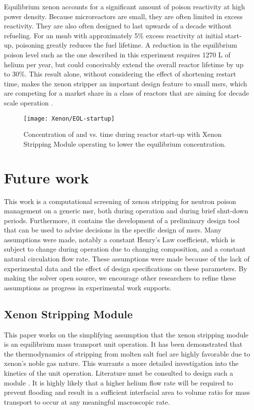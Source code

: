  Equilibrium xenon accounts for a significant amount of poison reactivity at high power density. Because microreactors are small, they are often limited in excess reactivity. They are also often designed to last upwards of a decade without refueling. For an \acs{msnb} with approximately 5\% excess reactivity at initial start-up, \Xe poisoning greatly reduces the fuel lifetime. A reduction in the equilibrium poison level such as the one described in this experiment requires 1270 L of helium per year, but could conceivably extend the overall reactor lifetime by up to 30\%.
This result alone, without considering the effect of shortening restart time, makes the xenon stripper an important design feature to small \acsp{msr}, which are competing for a market share in a class of reactors that are aiming for decade scale operation \cite{PetersonMS}.

\begin{figure}[ht!]
    \centering
    \texttt{[image: Xenon/EOL-startup]}
    \caption[Concentration of \I and \Xe vs. time during start-up - End of Life Fuel Mode]{Concentration of \I and \Xe vs. time during reactor start-up with Xenon Stripping Module operating to lower the equilibrium \Xe concentration.}
    \label{fig:EOLstartup}
\end{figure}


\section{Future work} \label{sec-fwk}
This work is a computational screening of xenon stripping for neutron poison management on a generic \acs{msr}, both during operation and during brief shut-down periods. Furthermore, it contains the development of a preliminary design tool that can be used to advise decisions in the specific design of \acsp{msr}. Many assumptions were made, notably a constant Henry's Law coefficient, which is subject to change during operation due to changing composition, and a constant natural circulation flow rate. These assumptions were made because of the lack of experimental data and the effect of design specifications on these parameters. By making the solver open source, we encourage other researchers to refine these assumptions as progress in experimental work supports.

\subsection{Xenon Stripping Module}
This paper works on the simplifying assumption that the xenon stripping module is an equilibrium mass transport unit operation. It has been demonstrated that the thermodynamics of \Xe stripping from molten salt fuel are highly favorable due to xenon's noble gas nature. This warrants a more detailed investigation into the kinetics of the unit operation. Literature must be consulted to design such a module \cite[Ch. 10]{Geankoplis}. It is highly likely that a higher helium flow rate will be required to prevent flooding and result in a sufficient interfacial area to volume ratio for mass transport to occur at any meaningful macroscopic rate. 

